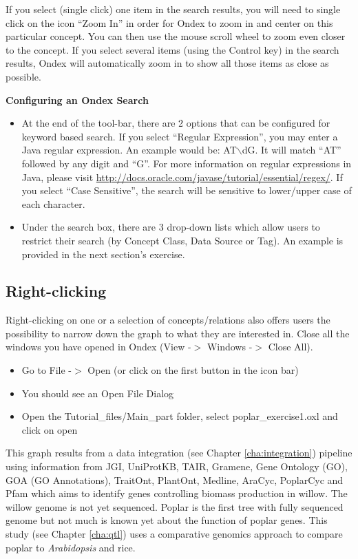 If you select (single click) one item in the search results, you will need to single click on the icon ``Zoom In'' in order for Ondex to zoom in and center on this particular concept. 
You can then use the mouse scroll wheel to zoom even closer to the concept.
If you select several items (using the Control key) in the search results, Ondex will automatically zoom in to show all those items as close as possible.

\vspace{0.5cm}\textbf{Configuring an Ondex Search }
\begin{itemize}
\item At the end of the tool-bar, there are 2 options that can be configured for keyword based search. 
If you select ``Regular Expression'', you may enter a Java regular expression. An example would be: AT$\backslash$dG.
It will match ``AT'' followed by any digit and ``G''. For more information on regular expressions in Java, please visit \url{http://docs.oracle.com/javase/tutorial/essential/regex/}.
If you select ``Case Sensitive'', the search will be sensitive to lower/upper case of each character.
\item Under the search box, there are 3 drop-down lists which allow users to restrict their search (by Concept Class, Data Source or Tag).
An example is provided in the next section's exercise.
\end{itemize}

\subsection{Right-clicking}
\label{sec:right-clicking}
Right-clicking on one or a selection of concepts/relations also offers users the possibility to narrow down the graph to what they are interested in.
Close all the windows you have opened in Ondex (View -$>$ Windows -$>$ Close All).

\begin{itemize}
\item Go to File -$>$ Open  (or click on the first button in the icon bar)
\item You should see an Open File Dialog
\item Open the Tutorial\_files/Main\_part folder, select poplar\_exercise1.oxl and click on open
\end{itemize}

This graph results from a data integration (see Chapter \ref{cha:integration}) pipeline using information from JGI,
UniProtKB, TAIR, Gramene, Gene Ontology (GO), GOA (GO Annotations), TraitOnt, PlantOnt, Medline, AraCyc, PoplarCyc and Pfam
which aims to identify genes controlling biomass production in willow.
The willow genome is not yet sequenced. Poplar is the first tree with fully sequenced genome but
not much is known yet about the function of poplar genes.
This study (see Chapter \ref{cha:qtl}) uses a comparative genomics approach to compare poplar to {\it{Arabidopsis}} and rice.

